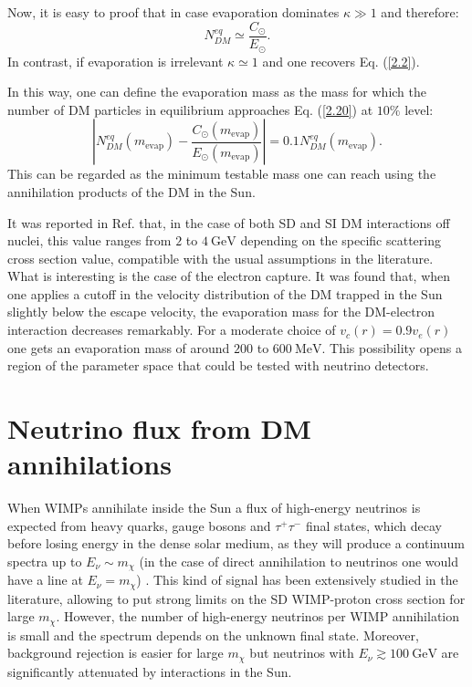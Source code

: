 Now, it is easy to proof that in case evaporation dominates $\kappa \gg 1$ and therefore:
\begin{equation}\label{2.20}
	N_{DM}^{eq} \simeq \frac{C_{\odot}}{E_{\odot}}.
\end{equation}
In contrast, if evaporation is irrelevant $\kappa \simeq 1$ and one recovers Eq. (\ref{2.2}).

In this way, one can define the evaporation mass as the mass for which the number of DM particles in equilibrium approaches Eq. (\ref{2.20}) at $10 \%$ level:
\begin{equation}\label{2.21}
	\left| N_{DM}^{eq}(m_{\mathrm{evap}}) - \frac{C_{\odot}(m_{\mathrm{evap}})}{E_{\odot}(m_{\mathrm{evap}})} \right| = 0.1 N_{DM}^{eq}(m_{\mathrm{evap}}).
\end{equation}
This can be regarded as the minimum testable mass one can reach using the annihilation products of the DM in the Sun.

It was reported in Ref. \cite{Palomares2017} that, in the case of both SD and SI DM interactions off nuclei, this value ranges from $2$ to $4 \ \mathrm{GeV}$ depending on the specific scattering cross section value, compatible with the usual assumptions in the literature. What is interesting is the case of the electron capture. It was found that, when one applies a cutoff in the velocity distribution of the DM trapped in the Sun slightly below the escape velocity, the evaporation mass for the DM-electron interaction decreases remarkably. For a moderate choice of $v_{c}(r) = 0.9 v_{e}(r)$ one gets an evaporation mass of around $200$ to $600 \ \mathrm{MeV}$. This possibility opens a region of the parameter space that could be tested with neutrino detectors.

\section{Neutrino flux from DM annihilations}

When WIMPs annihilate inside the Sun a flux of high-energy neutrinos is expected from heavy quarks, gauge bosons and $\tau^{+}\tau^{-}$ final states, which decay before losing energy in the dense solar medium, as they will produce a continuum spectra up to $E_{\nu} \sim m_{\chi}$ (in the case of direct annihilation to neutrinos one would have a line at $E_{\nu} = m_{\chi}$) \cite{Rott2012}. This kind of signal has been extensively studied  in the literature, allowing to put strong limits on the SD WIMP-proton cross section for large $m_{\chi}$. However, the number of high-energy neutrinos per WIMP annihilation is small and the spectrum depends on the unknown final state. Moreover, background rejection is easier for large $m_{\chi}$ but neutrinos with $E_{\nu} \gtrsim 100 \ \mathrm{GeV}$ are significantly attenuated by interactions in the Sun.

